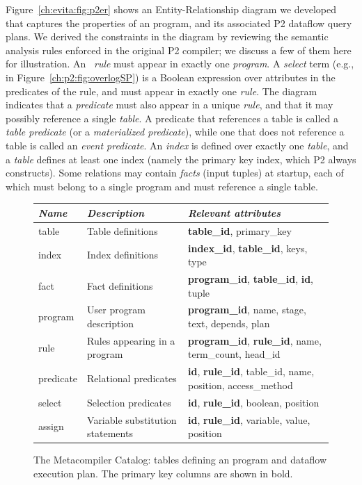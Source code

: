 Figure~\ref{ch:evita:fig:p2er} shows an Entity-Relationship diagram we
developed that captures the properties of an \OVERLOG program, and its
associated P2 dataflow query plans.  We derived the constraints in the diagram
by reviewing the semantic analysis rules enforced in the original P2 compiler;
we discuss a few of them here for illustration.  An \OVERLOG~{\em rule} must
appear in exactly one {\em program}.  A {\em select} term (e.g.,
 in Figure~\ref{ch:p2:fig:overlogSP}) is a
Boolean expression over attributes in the predicates of the rule, and must
appear in exactly one {\em rule}.  The diagram indicates that a {\em predicate}
must also appear in a unique {\em rule}, and that it may possibly reference a
single {\em table}.  A predicate that references a table is called a {\em table
predicate} (or a \emph{materialized predicate}), while one that does not
reference a table is called an {\em event predicate}.  An {\em index} is
defined over exactly one {\em table}, and a {\em table} defines at least one
index (namely the primary key index, which P2 always constructs).  Some
relations may contain {\em facts} (input tuples) at startup, each of which must
belong to a single program and must reference a single table.

\begin{figure}
\ssp
\begin{tabular}{|l|l|p{7cm}|} \hline
{\it Name}& {\it Description} & {\it Relevant attributes} \\ \hline\hline
table     & Table definitions & {\bf table\_id}, primary\_key\\ \hline
index     & Index definitions & {\bf index\_id}, {\bf table\_id}, keys, type \\ \hline
fact      & Fact definitions  & {\bf program\_id}, {\bf table\_id}, {\bf id}, tuple\\ \hline
program   & User program description     & {\bf program\_id}, name, stage, text, depends, plan \\ \hline
rule      & Rules appearing in a program   & {\bf program\_id}, {\bf rule\_id}, name,  term\_count, head\_id \\ \hline
predicate & Relational predicates  & {\bf id}, {\bf rule\_id}, table\_id, name, position, access\_method \\ \hline
select    & Selection predicates  & {\bf id}, {\bf rule\_id}, boolean, position \\  \hline
assign    & Variable substitution statements & {\bf id}, {\bf rule\_id}, variable, value, position \\ \hline 
\end{tabular}
\caption{The Metacompiler Catalog: tables defining an \OVERLOG program and dataflow execution plan.
         The primary key columns are shown in bold. }
\label{tbl:catalog}
\end{figure}

